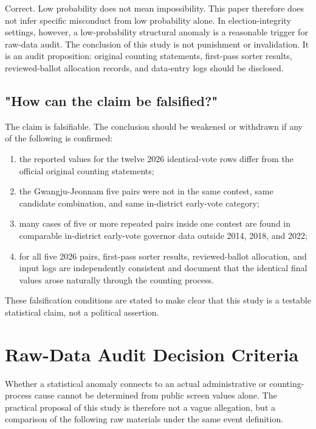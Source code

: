 \documentclass[preprint]{../ieie/IEIE}
\begin{document}
Correct. Low probability does not mean impossibility. This paper therefore does not infer specific misconduct from low probability alone. In election-integrity settings, however, a low-probability structural anomaly is a reasonable trigger for raw-data audit. The conclusion of this study is not punishment or invalidation. It is an audit proposition: original counting statements, first-pass sorter results, reviewed-ballot allocation records, and data-entry logs should be disclosed.

\subsection{"How can the claim be falsified?"}

The claim is falsifiable. The conclusion should be weakened or withdrawn if any of the following is confirmed:

\begin{enumerate}
\item the reported values for the twelve 2026 identical-vote rows differ from the official original counting statements;
\item the Gwangju-Jeonnam five pairs were not in the same contest, same candidate combination, and same in-district early-vote category;
\item many cases of five or more repeated pairs inside one contest are found in comparable in-district early-vote governor data outside 2014, 2018, and 2022;
\item for all five 2026 pairs, first-pass sorter results, reviewed-ballot allocation, and input logs are independently consistent and document that the identical final values arose naturally through the counting process.
\end{enumerate}

These falsification conditions are stated to make clear that this study is a testable statistical claim, not a political assertion.

\section{Raw-Data Audit Decision Criteria}

Whether a statistical anomaly connects to an actual administrative or counting-process cause cannot be determined from public screen values alone. The practical proposal of this study is therefore not a vague allegation, but a comparison of the following raw materials under the same event definition.
\end{document}
